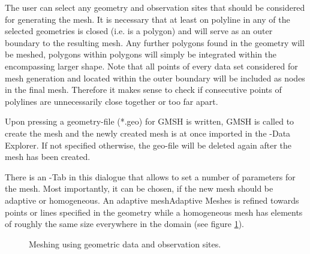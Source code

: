 The user can select any geometry and observation sites that should be considered for generating the mesh. It is necessary that at least on polyline in any of the selected geometries is closed (i.e. is a polygon) and will serve as an outer boundary to the resulting mesh. Any further polygons found in the geometry will be meshed, polygons within polygons will simply be integrated within the encompassing larger shape. Note that all points of every data set considered for mesh generation and located within the outer boundary will be included as nodes in the final mesh. Therefore it makes sense to check if consecutive points of polylines are unnecessarily close together or too far apart.

Upon pressing  a geometry-file (*.geo) for GMSH is written, GMSH is called to create the mesh and the newly created mesh is at once imported in the \ogs-Data Explorer. If not specified otherwise, the geo-file will be deleted again after the mesh has been created.

There is an -Tab in this dialogue that allows to set a number of parameters for the mesh. Most importantly, it can be chosen, if the new mesh should be adaptive or homogeneous. An adaptive mesh{Adaptive Meshes} is refined towards points or lines specified in the geometry while a homogeneous mesh has elements of roughly the same size everywhere in the domain (see figure \ref{fig:meshing}).

\begin{figure}[tb]
\begin{center}
\enspace
{}\enspace
{}
\end{center}
\caption{Meshing using geometric data and observation sites.} \label{fig:meshing}
\end{figure}

